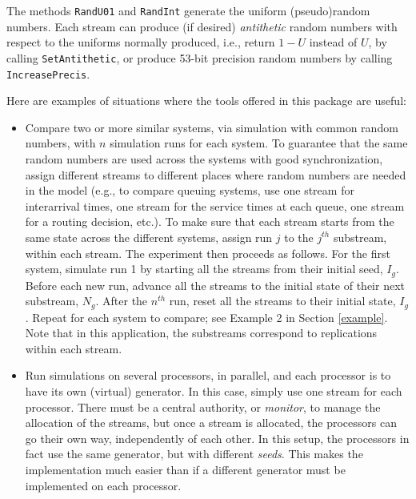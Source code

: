 \documentclass[12pt]{article}
\begin{document}
The methods {\tt RandU01} and {\tt RandInt}
generate the uniform (pseudo)random numbers. Each stream can
produce (if desired) {\em antithetic\/} random numbers with respect
to the uniforms normally produced, i.e., return $1-U$ instead of
$U$, by calling {\tt SetAntithetic}, or produce
53-bit precision random numbers by calling {\tt IncreasePrecis}.

Here are examples of situations where the tools offered in this
package are useful:

\begin{itemize}
\item
Compare two or more similar systems, via simulation with common
random numbers, with $n$ simulation runs for each system. To
guarantee that the same random numbers are used across the systems
with good synchronization, assign different streams to different
places where random numbers are needed in the model (e.g., to
compare queuing systems, use one stream for interarrival times,
one stream for the service times at each queue, one stream for a
routing decision, etc.). To make sure that each stream starts from
the same state across the different systems, assign run $j$ to the
$j^{th}$ substream, within each stream. The experiment then
proceeds as follows. For the first system, simulate run 1 by
starting all the streams from their initial seed, $I_g$. Before
each new run, advance all the streams to the initial state of
their next substream, $N_g$. After the $n^{th}$ run, reset all the
streams to their initial state, $I_g$. Repeat for each system to
compare; see Example 2 in Section \ref{example}. Note that in this
application, the substreams correspond to replications within each
stream.

\item
Run simulations on several processors, in parallel, and each
processor is to have its own (virtual) generator. In this case,
simply use one stream for each processor. There must be a central
authority, or {\em monitor}, to manage the allocation of the
streams, but once a stream is allocated, the processors can go
their own way, independently of each other. In this setup, the
processors in fact use the same generator, but with different {\em
seeds}. This makes the implementation much easier than if a
different generator must be implemented on each processor.

\end{itemize}

\else  %

\end{document}
